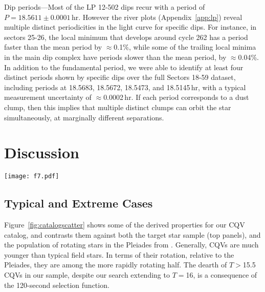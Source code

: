 \documentclass[11pt,twocolumn,tighten]{aastex63}
\begin{document}
{\sc Dip periods}---Most of the LP 12-502 dips recur with a period of
$P=18.5611 \pm 0.0001$\,hr.  However the river plots
(Appendix~\ref{app:lp}) reveal multiple distinct periodicities in the
light curve for specific dips.  For instance, in sectors 25-26, the
local minimum that develops around cycle 262 has a period faster than
the mean period by $\approx$0.1\%, while some of the trailing local
minima in the main dip complex have periods slower than the mean
period, by $\approx$0.04\%.  In addition to the fundamental period, we
were able to identify at least four distinct periods shown by specific
dips over the full Sectors 18-59 dataset, including periods at
18.5683, 18.5672, 18.5473, and 18.5145\,hr, with a typical measurement
uncertainty of $\approx$0.0002\,hr.  If each period corresponds to a
dust clump, then this implies that multiple distinct clumps can orbit
the star simultaneously, at marginally different separations.






\section{Discussion}
\label{sec:discussion}

\begin{figure*}[!t]
	\begin{center}
		\centering
		\texttt{[image: f7.pdf]}
		\vspace{-0.1cm}
		\caption{
      {\bf Properties of CQVs identified by our search}.
      The \ngoods\ bonafide CQVs in Table~\ref{tab:thetable} are 
      the dark blue circles; \nmaybes\ candidate CQVs are light blue circles.
      The top panels show the \nstarssearched\ target stars with 120-second cadence TESS data
      as the shaded gray background;
      darker regions correspond to a larger relative number of searched stars.
      The lower-left panel compares the rotation--color distribution of CQVs against the rotation
      periods of K- and M-dwarfs in the Pleiades from \citet{2016AJ....152..114R}.
      The lower-middle panel plots the derived corotation radii
      $R_{\rm cr} = (GM/\Omega^2)^{1/3}$ in units of stellar radii against the measured
      CQV periods, in units of hours.
		}
		\label{fig:catalogscatter}
	\end{center}
\end{figure*}


\subsection{Typical and Extreme Cases}
\label{subsec:extreme}
Figure~\ref{fig:catalogscatter} shows some of the derived properties
for our CQV catalog, and contrasts them against both the target star
sample (top panels), and the population of rotating stars in the Pleiades
from \citet{2016AJ....152..114R}.
Generally, CQVs are much younger than typical field stars. 
In terms of their rotation, relative to the Pleiades,
they are among the more rapidly rotating half.
The dearth of $T$$>$15.5 CQVs in our sample, despite our search extending
to $T$$=$16, is a consequence of the 120-second selection function.
%
\end{document}
